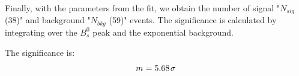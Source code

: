 Finally, with the parameters from the fit, we obtain the number of signal "$N_{sig}$ (38)" and background "$N_{bkg}$ (59)" events. The significance  is calculated  by integrating over the $B_s^0$ peak and the exponential background.

The significance is:
\begin{equation}
    m=5.68 \hspace{0.1em} \sigma
\end{equation}
